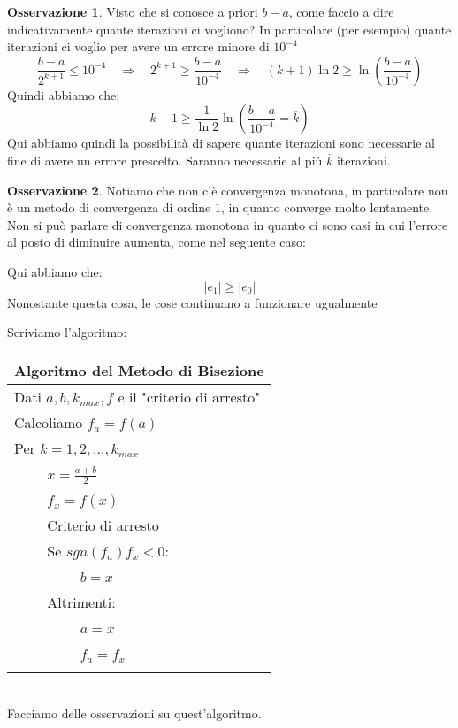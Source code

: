 \documentclass[11pt,a4paper,twoside]{article}
\theoremstyle{definition}
\newtheorem*{oss}{Osservazione}
\begin{document}
\begin{oss}
	Visto che si conosce a priori $b-a$, come faccio a dire indicativamente quante iterazioni ci vogliono? In particolare (per esempio) quante iterazioni ci voglio per avere un errore minore di $10^{-4}$
	\[ \frac{b-a}{2^{k+1}} \leq 10^{-4} \quad \Rightarrow \quad 2^{k+1}\geq \frac{b-a}{10^{-4}} \quad \Rightarrow \quad (k+1)\ln 2 \geq \ln \left( \frac{b-a}{10^{-4}} \right) \]
	Quindi abbiamo che:
	\[ k+1 \geq \frac{1}{\ln 2}\ln\left( \frac{b-a}{10^{-4}} = \overline k \right)\]
	Qui abbiamo quindi la possibilità di sapere quante iterazioni sono necessarie al fine di avere un errore prescelto. Saranno necessarie al più $\overline k$ iterazioni.
\end{oss}

\begin{oss}
	Notiamo che non c'è convergenza monotona, in particolare non è un metodo di convergenza di ordine $1$, in quanto converge molto lentamente.\\
	Non si può parlare di convergenza monotona in quanto ci sono casi in cui l'errore al posto di diminuire aumenta, come nel seguente caso:
	\begin{center}
	\end{center}
	Qui abbiamo che:
	\[ |e_1| \geq |e_0| \]
	Nonostante questa cosa, le cose continuano a funzionare ugualmente
\end{oss}
Scriviamo l'algoritmo:

\begin{tabular}{l}
	\\
	\textbf{Algoritmo del Metodo di Bisezione}\\
	\hline
	Dati $a,b,k_{max},f$ e il "criterio di arresto"\\
	Calcoliamo $f_a = f(a)$\\
	Per $k = 1,2,...,k_{max}$\\
	$\qquad$ $x = \frac{a+b}2$\\
	$\qquad$ $f_x = f(x)$\\
	$\qquad$ Criterio di arresto\\
	$\qquad$ Se $sgn(f_a)f_x<0$:\\
	$\qquad$ $\qquad$ $b = x$\\
	$\qquad$ Altrimenti:\\
	$\qquad$ $\qquad$ $a = x$\\
	$\qquad$ $\qquad$ $f_a = f_x$\\
	\\
\end{tabular}\\
Facciamo delle osservazioni su quest'algoritmo.
\end{document}
